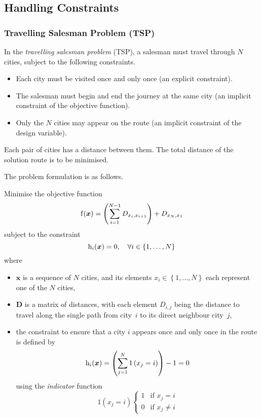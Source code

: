 \subsection{Handling Constraints}

\subsubsection{Travelling Salesman Problem (TSP)}

In the \emph{travelling salesman problem} (TSP), a salesman must travel through \( N \) cities, subject to the following constraints.
\begin{itemize}
  \item Each city must be visited once and only once (an explicit constraint).
  \item The salesman must begin and end the journey at the same city (an implicit constraint of the objective function).
  \item Only the \( N \) cities may appear on the route (an implicit constraint of the design variable).
\end{itemize}
Each pair of cities has a distance between them.
The total distance of the solution route is to be minimised.

The problem formulation is as follows.

Minimise the objective function
\begin{equation*}
  \function{f}{\boldsymbol{x}} = \left( \sum_{i=1}^{N-1} D_{x_{i},x_{i+1}} \right) + D_{x_{N},x_{1}}
\end{equation*}
subject to the constraint
\begin{equation*}
  \function[_{i}]{h}{\boldsymbol{x}} = 0, \quad \forall i \in \left\{ 1, \ldots, N \right\}
\end{equation*}
where
\begin{itemize}
  \item \( \boldsymbol{x} \) is a sequence of \( N \) cities, and its elements \( x_{i} \in \left\{ 1, \ldots, N \right\} \) each represent one of the \( N \) cities,
  \item \( \mathbf{D} \) is a matrix of distances, with each element \( D_{i,j} \) being the distance to travel along the single path from city~\( i \) to its direct neighbour city~\( j \),
  \item the constraint to ensure that a city \( i \) appears once and only once in the route is defined by
  \begin{equation*}
    \function[_{i}]{h}{\boldsymbol{x}} = \left( \sum_{j=1}^{N} 1 \left( x_{j} = i \right) \right) -1 = 0
  \end{equation*}
  using the \emph{indicator} function
  \begin{equation*}
    1 \left( x_{j} = i \right) \begin{cases}
      1 & \text{if } x_{j} = i \\
      0 & \text{if } x_{j} \not= i
    \end{cases}
  \end{equation*}
\end{itemize}

